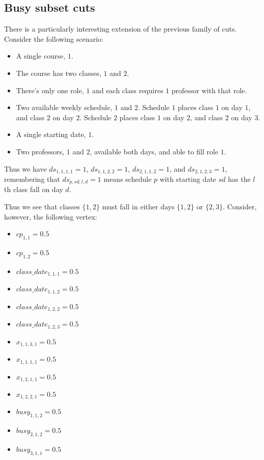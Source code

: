 \subsection{Busy subset cuts}
There is a particularly interesting extension of the previous family of cuts. Consider the following scenario:
\begin{itemize}
\item A single course, $1$.
\item The course has two classes, $1$ and $2$.
\item There's only one role, $1$ and each class requires $1$ professor with that role.
\item Two available weekly schedule, $1$ and $2$. Schedule $1$ places class $1$ on day $1$, and class $2$ on day $2$. Schedule $2$ places class $1$ on day $2$, and class $2$ on day $3$.
\item A single starting date, $1$.
\item Two professors, $1$ and $2$, available both days, and able to fill role $1$.
\end{itemize}

Thus we have $ds_{1, 1, 1, 1} = 1$, $ds_{1, 1, 2, 2} = 1$, $ds_{2, 1, 1, 2} = 1$, and $ds_{2, 1, 2, 3} = 1$, remembering that $ds_{p, sd, l, d} = 1$ means schedule $p$ with starting date $sd$ has the $l$th class fall on day $d$.

Thus we see that classes $\{1, 2\}$ must fall in either days $\{1, 2\}$ or $\{2, 3\}$. Consider, however, the following vertex:

\begin{itemize}
\item $cp_{1, 1} = 0.5$
\item $cp_{1, 2} = 0.5$
\item $class\_date_{1, 1, 1} = 0.5$
\item $class\_date_{1, 1, 2} = 0.5$
\item $class\_date_{1, 2, 2} = 0.5$
\item $class\_date_{1, 2, 3} = 0.5$
\item $x_{1, 1, 3, 1} = 0.5$
\item $x_{1, 1, 1, 1} = 0.5$
\item $x_{1, 2, 1, 1} = 0.5$
\item $x_{1, 2, 2, 1} = 0.5$
\item $busy_{1, 1, 2} = 0.5$
\item $busy_{2, 1, 2} = 0.5$
\item $busy_{3, 1, 1} = 0.5$
\end{itemize}

